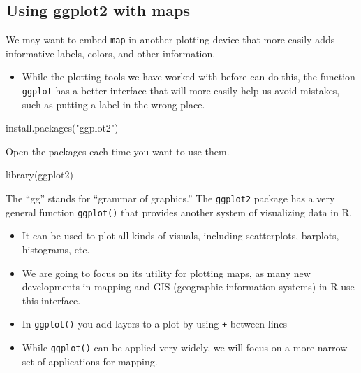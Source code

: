 \documentclass[
  letterpaper,
  DIV=11,
  numbers=noendperiod]{scrreprt}
\newenvironment{Shaded}{\begin{snugshade}}{\end{snugshade}}
\newcommand{\FunctionTok}[1]{\textcolor[rgb]{0.28,0.35,0.67}{#1}}
\newcommand{\NormalTok}[1]{\textcolor[rgb]{0.00,0.23,0.31}{#1}}
\newcommand{\StringTok}[1]{\textcolor[rgb]{0.13,0.47,0.30}{#1}}
\providecommand{\tightlist}{%
  \setlength{\itemsep}{0pt}\setlength{\parskip}{0pt}}\usepackage{longtable,booktabs,array}
\begin{document}
\hypertarget{using-ggplot2-with-maps}{%
\subsection{Using ggplot2 with maps}\label{using-ggplot2-with-maps}}

We may want to embed \texttt{map} in another plotting device that more
easily adds informative labels, colors, and other information.

\begin{itemize}
\tightlist
\item
  While the plotting tools we have worked with before can do this, the
  function \texttt{ggplot} has a better interface that will more easily
  help us avoid mistakes, such as putting a label in the wrong place.
\end{itemize}

\begin{Shaded}
\begin{Highlighting}[]
\FunctionTok{install.packages}\NormalTok{(}\StringTok{"ggplot2"}\NormalTok{)}
\end{Highlighting}
\end{Shaded}

Open the packages each time you want to use them.

\begin{Shaded}
\begin{Highlighting}[]
\FunctionTok{library}\NormalTok{(ggplot2)}
\end{Highlighting}
\end{Shaded}

The ``gg'' stands for ``grammar of graphics.'' The \texttt{ggplot2}
package has a very general function \texttt{ggplot()} that provides
another system of visualizing data in R.

\begin{itemize}
\tightlist
\item
  It can be used to plot all kinds of visuals, including scatterplots,
  barplots, histograms, etc.
\item
  We are going to focus on its utility for plotting maps, as many new
  developments in mapping and GIS (geographic information systems) in R
  use this interface.
\item
  In \texttt{ggplot()} you add layers to a plot by using \texttt{+}
  between lines
\item
  While \texttt{ggplot()} can be applied very widely, we will focus on a
  more narrow set of applications for mapping.
\end{itemize}
\end{document}
